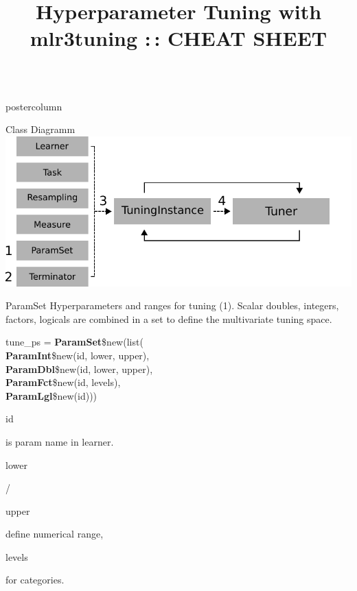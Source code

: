 \documentclass{beamer}
\title{Hyperparameter Tuning with mlr3tuning :\,: CHEAT SHEET} %
\newlength{\columnheight} %
\newcommand{\codeinline}[1]{\begin{codeboxinline}#1\end{codeboxinline}}
\begin{document}
\begin{frame}[fragile]{}
	\begin{columns}
		\begin{column}{.245\textwidth}
			\begin{beamercolorbox}[center]{postercolumn}
				\begin{minipage}{.98\textwidth}
					\parbox[t][\columnheight]{\textwidth}{
						\begin{myblock}{Class Diagramm}
                            \includegraphics[width=\textwidth]{img/class_diagram.pdf}
						\end{myblock}
						\begin{myblock}{ParamSet}
					        Hyperparameters and ranges for tuning (1). 
					        Scalar doubles, integers, factors, logicals are combined 
					        in a set to define the multivariate tuning space.
							\\
							\begin{codeboxmultiline}[width=20.75cm]
								tune\_ps = \textbf{ParamSet}\$new(list(\\
								\hspace*{1ex}\textbf{ParamInt}\$new(id, lower, upper),\\
								\hspace*{1ex}\textbf{ParamDbl}\$new(id, lower, upper),\\
								\hspace*{1ex}\textbf{ParamFct}\$new(id, levels),\\
								\hspace*{1ex}\textbf{ParamLgl}\$new(id)))
							\end{codeboxmultiline}
                            \codeinline{id} is param name in learner. 
                            \codeinline{lower}/\codeinline{upper} define 
                            numerical range, \codeinline{levels} for categories.
                            \vspace{1em}
                            \\ 

\end{myblock}}
\end{minipage}
\end{beamercolorbox}
\end{column}
\end{columns}
\end{frame}
\end{document}
